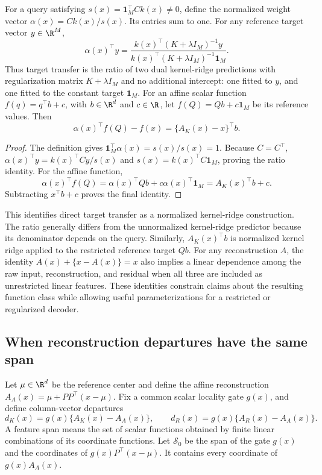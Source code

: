 \begin{proposition}
\label{prop:mechanism-krr}
For a query satisfying $s(x)=\mathbf1_M^\top Ck(x)\ne0$, define the
normalized weight vector $\alpha(x)=Ck(x)/s(x)$. Its entries sum to one.
For any reference target vector $y\in\R^M$,
\[
 \alpha(x)^\top y=
 \frac{k(x)^\top(K+\lambda I_M)^{-1}y}
 {k(x)^\top(K+\lambda I_M)^{-1}\mathbf1_M}.
\]
Thus target transfer is the ratio of two dual kernel-ridge predictions
with regularization matrix $K+\lambda I_M$ and no additional intercept:
one fitted to $y$, and one fitted to the constant target $\mathbf1_M$.
For an affine scalar function $f(q)=q^\top b+c$, with
$b\in\R^d$ and $c\in\R$, let $f(Q)=Qb+c\mathbf1_M$ be its reference
values. Then
\[
 \alpha(x)^\top f(Q)-f(x)=\{A_K(x)-x\}^\top b.
\]
\end{proposition}
\begin{proof}
The definition gives
$\mathbf1_M^\top\alpha(x)=s(x)/s(x)=1$. Because $C=C^\top$,
$\alpha(x)^\top y=k(x)^\top Cy/s(x)$ and
$s(x)=k(x)^\top C\mathbf1_M$, proving the ratio identity.
For the affine function,
\[
 \alpha(x)^\top f(Q)
 =\alpha(x)^\top Qb+c\alpha(x)^\top\mathbf1_M
 =A_K(x)^\top b+c.
\]
Subtracting $x^\top b+c$ proves the final identity.
\end{proof}

This identifies direct target transfer as a normalized kernel-ridge
construction. The ratio generally differs from the unnormalized
kernel-ridge predictor because its denominator depends on the query.
Similarly, $A_K(x)^\top b$ is normalized kernel ridge applied to the
restricted reference target $Qb$. For any reconstruction $A$, the identity
$A(x)+\{x-A(x)\}=x$ also implies a linear dependence among the raw input,
reconstruction, and residual when all three are included as unrestricted
linear features. These identities constrain claims about the resulting
function class while allowing useful parameterizations for a restricted
or regularized decoder.

\subsection{When reconstruction departures have the same span}

Let $\mu\in\R^d$ be the reference center and define the affine
reconstruction $A_A(x)=\mu+PP^\top(x-\mu)$. Fix a common scalar locality
gate $g(x)$, and define column-vector departures
\[
 d_K(x)=g(x)\{A_K(x)-A_A(x)\},\qquad
 d_R(x)=g(x)\{A_R(x)-A_A(x)\}.
\]
A feature span means the set of scalar functions obtained by finite linear
combinations of its coordinate functions. Let $\mathcal S_0$ be the span
of the gate $g(x)$ and the coordinates of $g(x)P^\top(x-\mu)$.
It contains every coordinate of $g(x)A_A(x)$.

